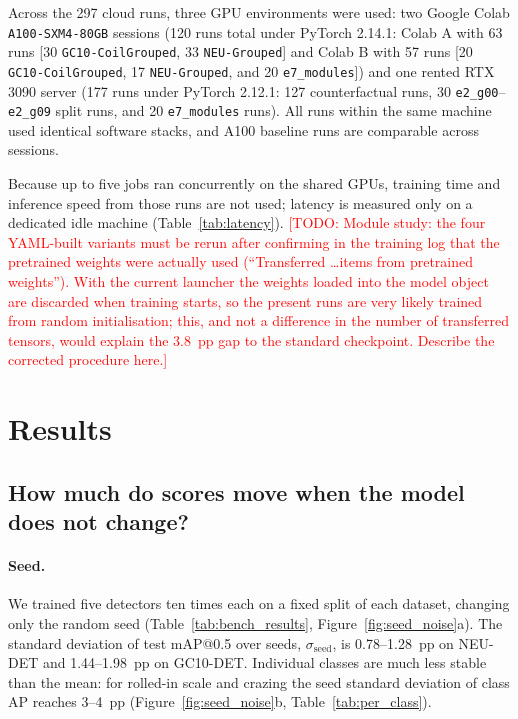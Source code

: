 \documentclass[pdflatex,sn-apa]{sn-jnl}
\newcommand{\todo}[1]{\textcolor{red}{[TODO: #1]}}
\begin{document}
Across the 297 cloud runs, three GPU environments were used: two Google Colab \texttt{A100-SXM4-80GB} sessions (120 runs total under PyTorch 2.14.1: Colab A with 63 runs [30 \texttt{GC10-CoilGrouped}, 33 \texttt{NEU-Grouped}] and Colab B with 57 runs [20 \texttt{GC10-CoilGrouped}, 17 \texttt{NEU-Grouped}, and 20 \texttt{e7\_modules}]) and one rented RTX 3090 server (177 runs under PyTorch 2.12.1: 127 counterfactual runs, 30 \texttt{e2\_g00}--\texttt{e2\_g09} split runs, and 20 \texttt{e7\_modules} runs). All runs within the same machine used identical software stacks, and A100 baseline runs are comparable across sessions.

Because up to five jobs ran concurrently on the shared GPUs, training time and inference speed from those runs are not used; latency is measured only on a dedicated idle machine (Table~\ref{tab:latency}). \todo{Module study: the four YAML-built variants must be rerun after confirming in the training log that the pretrained weights were actually used (``Transferred \ldots items from pretrained weights''). With the current launcher the weights loaded into the model object are discarded when training starts, so the present runs are very likely trained from random initialisation; this, and not a difference in the number of transferred tensors, would explain the 3.8~pp gap to the standard checkpoint. Describe the corrected procedure here.}

\section{Results}\label{sec:bench_results}

\subsection{How much do scores move when the model does not change?}

\paragraph{Seed.} We trained five detectors ten times each on a fixed split of each dataset, changing only the random seed (Table~\ref{tab:bench_results}, Figure~\ref{fig:seed_noise}a). The standard deviation of test mAP@0.5 over seeds, $\sigma_{\text{seed}}$, is 0.78--1.28~pp on NEU-DET and 1.44--1.98~pp on GC10-DET. Individual classes are much less stable than the mean: for rolled-in scale and crazing the seed standard deviation of class AP reaches 3--4~pp (Figure~\ref{fig:seed_noise}b, Table~\ref{tab:per_class}).
\end{document}
